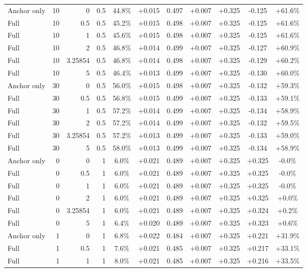 \begin{table}[htbp]
\begin{tabular}{lrrrccccccc}
Anchor only & 10 & 0 & 0.5 & 44.8\% & +0.015 & 0.497 & +0.007 & +0.325 & -0.125 & +61.6\% \\
Full & 10 & 0.5 & 0.5 & 45.2\% & +0.015 & 0.498 & +0.007 & +0.325 & -0.125 & +61.6\% \\
Full & 10 & 1 & 0.5 & 45.6\% & +0.015 & 0.498 & +0.007 & +0.325 & -0.125 & +61.6\% \\
Full & 10 & 2 & 0.5 & 46.8\% & +0.014 & 0.499 & +0.007 & +0.325 & -0.127 & +60.9\% \\
Full & 10 & 3.25854 & 0.5 & 46.8\% & +0.014 & 0.498 & +0.007 & +0.325 & -0.129 & +60.2\% \\
Full & 10 & 5 & 0.5 & 46.4\% & +0.013 & 0.499 & +0.007 & +0.325 & -0.130 & +60.0\% \\
Anchor only & 30 & 0 & 0.5 & 56.0\% & +0.015 & 0.498 & +0.007 & +0.325 & -0.132 & +59.3\% \\
Full & 30 & 0.5 & 0.5 & 56.8\% & +0.015 & 0.499 & +0.007 & +0.325 & -0.133 & +59.1\% \\
Full & 30 & 1 & 0.5 & 57.2\% & +0.014 & 0.499 & +0.007 & +0.325 & -0.134 & +58.9\% \\
Full & 30 & 2 & 0.5 & 57.2\% & +0.014 & 0.499 & +0.007 & +0.325 & -0.132 & +59.5\% \\
Full & 30 & 3.25854 & 0.5 & 57.2\% & +0.013 & 0.499 & +0.007 & +0.325 & -0.133 & +59.0\% \\
Full & 30 & 5 & 0.5 & 58.0\% & +0.013 & 0.499 & +0.007 & +0.325 & -0.134 & +58.9\% \\
Anchor only & 0 & 0 & 1 & 6.0\% & +0.021 & 0.489 & +0.007 & +0.325 & +0.325 & -0.0\% \\
Full & 0 & 0.5 & 1 & 6.0\% & +0.021 & 0.489 & +0.007 & +0.325 & +0.325 & -0.0\% \\
Full & 0 & 1 & 1 & 6.0\% & +0.021 & 0.489 & +0.007 & +0.325 & +0.325 & -0.0\% \\
Full & 0 & 2 & 1 & 6.0\% & +0.021 & 0.489 & +0.007 & +0.325 & +0.325 & +0.0\% \\
Full & 0 & 3.25854 & 1 & 6.0\% & +0.021 & 0.489 & +0.007 & +0.325 & +0.324 & +0.2\% \\
Full & 0 & 5 & 1 & 6.4\% & +0.020 & 0.489 & +0.007 & +0.325 & +0.323 & +0.6\% \\
Anchor only & 1 & 0 & 1 & 6.8\% & +0.022 & 0.484 & +0.007 & +0.325 & +0.221 & +31.9\% \\
Full & 1 & 0.5 & 1 & 7.6\% & +0.021 & 0.485 & +0.007 & +0.325 & +0.217 & +33.1\% \\
Full & 1 & 1 & 1 & 8.0\% & +0.021 & 0.485 & +0.007 & +0.325 & +0.216 & +33.5\% \\

\end{tabular}
\end{table}
